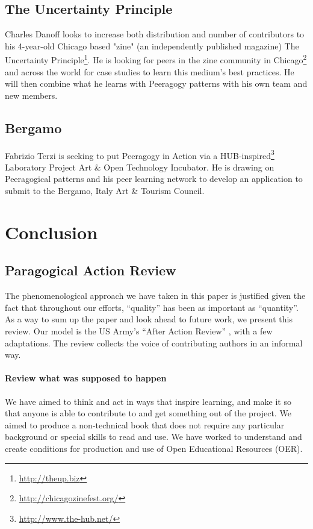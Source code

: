 \documentclass{acm_proc_article-sp}
\begin{document}
\subsection{The Uncertainty Principle}

Charles Danoff looks to increase both distribution and number of contributors to his 4-year-old Chicago based "zine" (an independently published magazine) The Uncertainty Principle\footnote{\url{http://theup.biz}}. He is looking for peers in the zine community in Chicago\footnote{\url{http://chicagozinefest.org/}} and across the world for case studies to learn this medium's best practices. He will then combine what he learns with Peeragogy patterns with his own team and new members.

\subsection{Bergamo}

Fabrizio Terzi is seeking to put Peeragogy in Action via a
HUB-inspired\footnote{\url{http://www.the-hub.net/}} Laboratory
Project Art \& Open Technology Incubator. He is drawing on
Peeragogical patterns and his peer learning network to develop an
application to submit to the Bergamo, Italy Art \& Tourism Council.

\section{Conclusion} \label{conclusion}

\subsection{Paragogical Action Review} \label{PAR}

The phenomenological approach we have taken in this paper is justified
given the fact that throughout our efforts, ``quality'' has been as
important as ``quantity''.  As a way to sum up the paper and look
ahead to future work, we present this review.  Our model is the US
Army's ``After Action Review'' \cite{armyXtrainingX2002}, with a few
adaptations.  The review collects the voice of contributing authors in
an informal way.

\paragraph{Review what was supposed to happen}
We have aimed to think and act in ways that inspire learning, and make
it so that anyone is able to contribute to and get something out of
the project. We aimed to produce a non-technical book that does not
require any particular background or special skills to read and use.
We have worked to understand and create conditions for production and
use of Open Educational Resources (OER).
\end{document}
